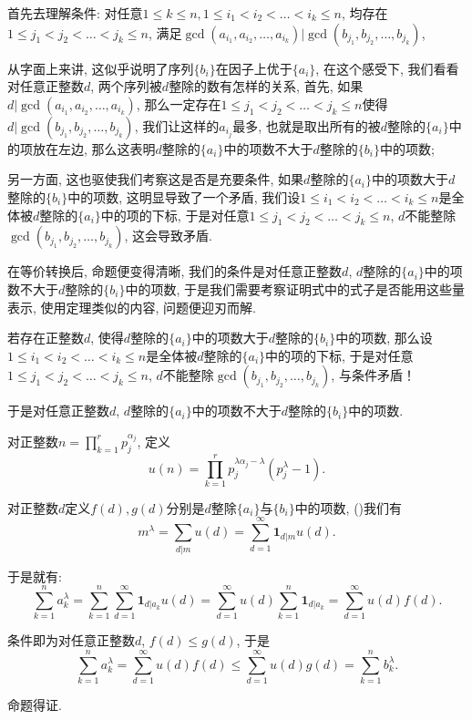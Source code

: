\documentclass[lang=cn,12pt,thmcnt=section]{elegantbook}
\renewcommand{\note}[1]{({\kaishu\dashuline{#1}})}
\begin{document}
\begin{analysis}
首先去理解条件: 对任意$1\le k\le n,1\le i_1<i_2<\dots{}<i_k\le n$, 均存在$1\le j_1<j_2<\dots{}<j_k\le n$, 满足$\gcd{(a_{i_1},a_{i_2},\dots{},a_{i_k})}|\gcd{(b_{j_1},b_{j_2},\dots{},b_{j_k})}$, 

从字面上来讲, 这似乎说明了序列$\{b_i\}$在因子上优于$\{a_i\}$, 在这个感受下, 我们看看对任意正整数$d$, 两个序列被$d$整除的数有怎样的关系, 首先, 如果$d|\gcd{(a_{i_1},a_{i_2},\dots{},a_{i_k})}$, 那么一定存在$1\le j_1<j_2<\dots{}<j_k\le n$使得$d|\gcd{(b_{j_1},b_{j_2},\dots{},b_{j_k})}$, 我们让这样的$a_{i_j}$最多, 也就是取出所有的被$d$整除的$\{a_i\}$中的项放在左边, 那么这表明$d$整除的$\{a_i\}$中的项数不大于$d$整除的$\{b_i\}$中的项数; 

另一方面, 这也驱使我们考察这是否是充要条件, 如果$d$整除的$\{a_i\}$中的项数大于$d$整除的$\{b_i\}$中的项数, 这明显导致了一个矛盾, 我们设$1\le i_1<i_2<\dots{}<i_k\le n$是全体被$d$整除的$\{a_i\}$中的项的下标, 于是对任意$1\le j_1<j_2<\dots{}<j_k\le n$, $d$不能整除$\gcd{(b_{j_1},b_{j_2},\dots{},b_{j_k})}$, 这会导致矛盾.

在等价转换后, 命题便变得清晰, 我们的条件是对任意正整数$d$, $d$整除的$\{a_i\}$中的项数不大于$d$整除的$\{b_i\}$中的项数, 于是我们需要考察证明式中的式子是否能用这些量表示, 使用定理类似的内容, 问题便迎刃而解.
\end{analysis}

\begin{solution}
若存在正整数$d$, 使得$d$整除的$\{a_i\}$中的项数大于$d$整除的$\{b_i\}$中的项数, 那么设$1\le i_1<i_2<\dots{}<i_k\le n$是全体被$d$整除的$\{a_i\}$中的项的下标, 于是对任意$1\le j_1<j_2<\dots{}<j_k\le n$, $d$不能整除$\gcd{(b_{j_1},b_{j_2},\dots{},b_{j_k})}$, 与条件矛盾！

于是对任意正整数$d$, $d$整除的$\{a_i\}$中的项数不大于$d$整除的$\{b_i\}$中的项数.

对正整数$n=\prod_{k=1}^r p_{j}^{\alpha_j}$, 定义
\[u(n)=\prod\limits_{k=1}^r p_{j}^{\lambda\alpha_j-\lambda}(p_j^{\lambda}-1).\]

对正整数$d$定义$f(d),g(d)$分别是$d$整除$\{a_i\}$与$\{b_i\}$中的项数, \note{类似于上面给出的定理, }我们有
\[
m^{\lambda}=\sum_{d|m}u(d)=\sum_{d=1}^{\infty} \mathbf{1}_{d|m}u(d).
\]

于是就有: 
\[
\sum_{k=1}^n a_k^{\lambda}=\sum_{k=1}^n \sum_{d=1}^{\infty} \mathbf{1}_{d|a_k}u(d)=\sum_{d=1}^{\infty}u(d)\sum_{k=1}^n\mathbf{1}_{d|a_k}=\sum_{d=1}^{\infty}u(d)f(d).
\]

条件即为对任意正整数$d$, $f(d)\le g(d)$, 于是
\[
\sum_{k=1}^n a_k^{\lambda}=\sum_{d=1}^{\infty}u(d)f(d)\le \sum_{d=1}^{\infty}u(d)g(d) =\sum_{k=1}^n b_k^{\lambda}.
\]

命题得证.
\end{solution}
\end{document}

